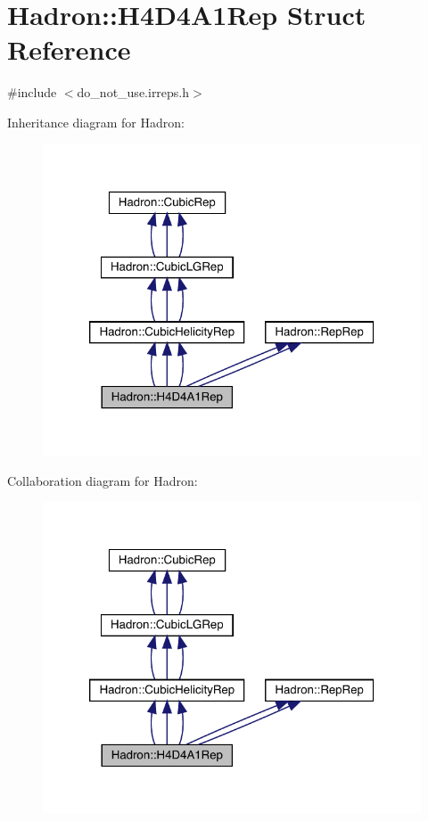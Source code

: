 \hypertarget{structHadron_1_1H4D4A1Rep}{}\section{Hadron\+:\+:H4\+D4\+A1\+Rep Struct Reference}
\label{structHadron_1_1H4D4A1Rep}


{\ttfamily \#include $<$do\+\_\+not\+\_\+use.\+irreps.\+h$>$}



Inheritance diagram for Hadron\+:
\nopagebreak
\begin{figure}[H]
\begin{center}
\leavevmode
\includegraphics[width=320pt]{d4/d74/structHadron_1_1H4D4A1Rep__inherit__graph}
\end{center}
\end{figure}


Collaboration diagram for Hadron\+:
\nopagebreak
\begin{figure}[H]
\begin{center}
\leavevmode
\includegraphics[width=320pt]{db/d4a/structHadron_1_1H4D4A1Rep__coll__graph}
\end{center}
\end{figure}
